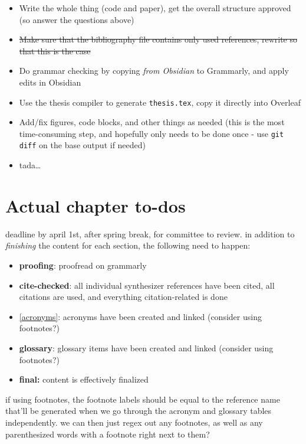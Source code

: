\begin{itemize}
\tightlist
\item
  Write the whole thing (code and paper), get the overall structure
  approved (so answer the questions above)
\item
  \st{Make sure that the bibliography file contains only used
  references, rewrite so that this is the case}
\item
  Do grammar checking by copying \emph{from Obsidian} to Grammarly, and
  apply edits in Obsidian
\item
  Use the thesis compiler to generate
  \passthrough{\lstinline!thesis.tex!}, copy it directly into Overleaf
\item
  Add/fix figures, code blocks, and other things as needed (this is the
  most time-consuming step, and hopefully only needs to be done once -
  use \passthrough{\lstinline!git diff!} on the base output if needed)
\item
  tada\ldots{}
\end{itemize}

\section{Actual chapter to-dos}\label{actual-chapter-to-dos}

deadline by april 1st, after spring break, for committee to review. in
addition to \emph{finishing} the content for each section, the following
need to happen:

\begin{itemize}
\tightlist
\item
  \textbf{proofing}: proofread on grammarly
\item
  \textbf{cite-checked}: all individual synthesizer references have been
  cited, all citations are used, and everything citation-related is done
\item
  \autoref{acronyms}: acronyms have been created and linked (consider
  using footnotes?)
\item
  \textbf{glossary}: glossary items have been created and linked
  (consider using footnotes?)
\item
  \textbf{final:} content is effectively finalized
\end{itemize}

if using footnotes, the footnote labels should be equal to the reference
name that'll be generated when we go through the acronym and glossary
tables independently. we can then just regex out any footnotes, as well
as any parenthesized words with a footnote right next to them?

